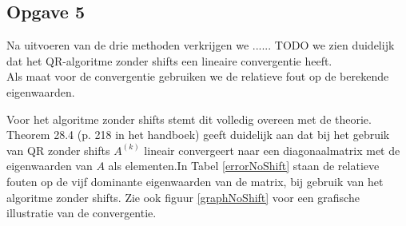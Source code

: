 \documentclass[a4paper, 12pt, titlepage]{report}
\begin{document}
\subsection{Opgave 5}
Na uitvoeren van de drie methoden verkrijgen we ...... TODO we zien duidelijk dat het QR-algoritme zonder shifts een lineaire convergentie heeft. \\

Als maat voor de convergentie gebruiken we de relatieve fout op de berekende eigenwaarden. 

Voor het algoritme zonder shifts stemt dit volledig overeen met de theorie. Theorem 28.4 (p. 218 in het handboek) geeft duidelijk aan dat bij het gebruik van QR zonder shifts $A^{(k)}$ lineair convergeert naar een diagonaalmatrix met de eigenwaarden van $A$ als elementen.In Tabel \ref{errorNoShift} staan de relatieve fouten op de vijf dominante eigenwaarden van de matrix, bij gebruik van het algoritme zonder shifts. Zie ook figuur \ref{graphNoShift} voor een grafische illustratie van de convergentie.\\
\end{document}
